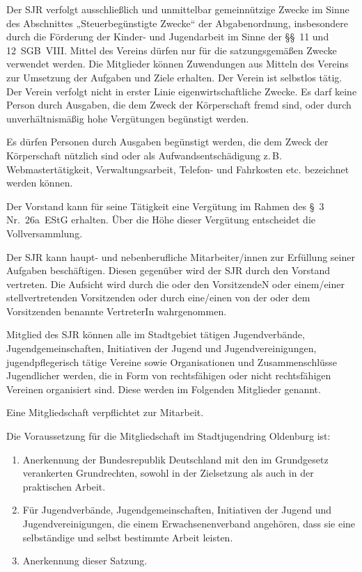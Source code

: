 \documentclass[10pt,a4paper,oneside,parskip=half]{scrartcl}
\begin{document}
\begin{contract}
Der SJR verfolgt ausschließlich und unmittelbar gemeinnützige Zwecke im Sinne des Abschnittes „Steuerbegünstigte Zwecke“ der Abgabenordnung, insbesondere durch die Förderung der Kinder- und Jugendarbeit im Sinne der §§~11 und 12~SGB~VIII. Mittel des Vereins dürfen nur für die satzungsgemäßen Zwecke verwendet werden. Die Mitglieder können Zuwendungen aus Mitteln des Vereins zur Umsetzung der Aufgaben und Ziele erhalten. Der Verein ist selbstlos tätig. Der Verein verfolgt nicht in erster Linie eigenwirtschaftliche Zwecke. Es darf keine Person durch Ausgaben, die dem Zweck der Körperschaft fremd sind, oder durch unverhältnismäßig hohe Vergütungen begünstigt werden.

Es dürfen Personen durch Ausgaben begünstigt werden, die dem Zweck der Körperschaft nützlich sind oder als Aufwandsentschädigung z.\,B. Webmastertätigkeit, Verwaltungsarbeit, Telefon- und Fahrkosten etc. bezeichnet werden können.

Der Vorstand kann für seine Tätigkeit eine Vergütung im Rahmen des §~3 Nr.~26a~EStG erhalten. Über die Höhe dieser Vergütung entscheidet die Vollversammlung.

Der SJR kann haupt- und nebenberufliche Mitarbeiter/innen zur Erfüllung seiner Aufgaben beschäftigen. Diesen gegenüber wird der SJR durch den Vorstand vertreten. Die Aufsicht wird durch die oder den VorsitzendeN oder einem/einer stellvertretenden Vorsitzenden oder durch eine/einen von der oder dem Vorsitzenden benannte VertreterIn wahrgenommen.

Mitglied des SJR können alle im Stadtgebiet tätigen Jugendverbände, Jugendgemeinschaften, Initiativen der Jugend und Jugendvereinigungen, jugendpflegerisch tätige Vereine sowie Organisationen und Zusammenschlüsse Jugendlicher werden, die in Form von rechtsfähigen oder nicht rechtsfähigen Vereinen organisiert sind. Diese werden im Folgenden Mitglieder genannt.

Eine Mitgliedschaft verpflichtet zur Mitarbeit.\label{mitgliedschaft_mitarbeit}

Die Voraussetzung für die Mitgliedschaft im Stadtjugendring Oldenburg ist:
\begin{enumerate}
\item Anerkennung der Bundesrepublik Deutschland mit den im Grundgesetz verankerten Grundrechten, sowohl in der Zielsetzung als auch in der praktischen Arbeit.
\item Für Jugendverbände, Jugendgemeinschaften, Initiativen der Jugend und Jugendvereinigungen, die einem Erwachsenenverband angehören, dass sie eine selbständige und selbst bestimmte Arbeit leisten.
\item Anerkennung dieser Satzung.
\end{enumerate}


\end{contract}
\end{document}
